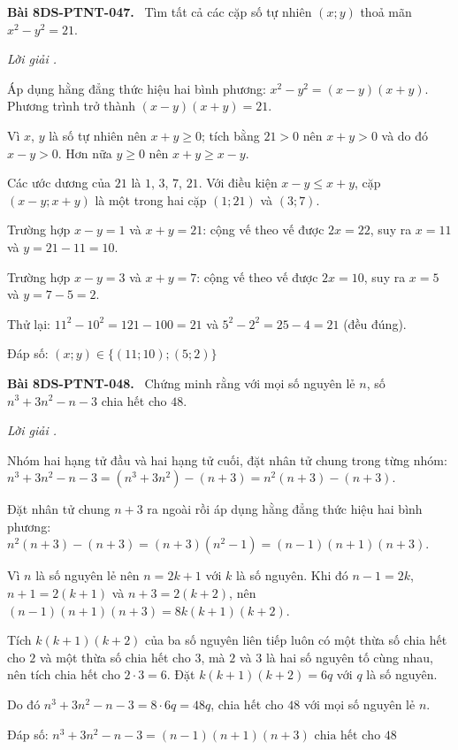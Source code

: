 \documentclass[12pt,a4paper]{article}
\newenvironment{problem}[1][]{\par\medskip\noindent\textbf{Bài #1.}\ }{\par}
\newenvironment{solution}[1][]{\par\noindent\textit{Lời giải #1.}\par}{\par}
\begin{document}
\begin{problem}[8DS-PTNT-047]
Tìm tất cả các cặp số tự nhiên $(x; y)$ thoả mãn $x^2 - y^2 = 21$.

\begin{solution}
Áp dụng hằng đẳng thức hiệu hai bình phương: $x^2 - y^2 = (x - y)(x + y)$. Phương trình trở thành $(x - y)(x + y) = 21$.

Vì $x$, $y$ là số tự nhiên nên $x + y \geq 0$; tích bằng $21 > 0$ nên $x + y > 0$ và do đó $x - y > 0$. Hơn nữa $y \geq 0$ nên $x + y \geq x - y$.

Các ước dương của $21$ là $1$, $3$, $7$, $21$. Với điều kiện $x - y \leq x + y$, cặp $(x - y; x + y)$ là một trong hai cặp $(1; 21)$ và $(3; 7)$.

Trường hợp $x - y = 1$ và $x + y = 21$: cộng vế theo vế được $2x = 22$, suy ra $x = 11$ và $y = 21 - 11 = 10$.

Trường hợp $x - y = 3$ và $x + y = 7$: cộng vế theo vế được $2x = 10$, suy ra $x = 5$ và $y = 7 - 5 = 2$.

Thử lại: $11^2 - 10^2 = 121 - 100 = 21$ và $5^2 - 2^2 = 25 - 4 = 21$ (đều đúng).

Đáp số: $\boxed{(x; y) \in \{(11; 10); (5; 2)\}}$
\end{solution}
\end{problem}

\begin{problem}[8DS-PTNT-048]
Chứng minh rằng với mọi số nguyên lẻ $n$, số $n^3 + 3n^2 - n - 3$ chia hết cho $48$.

\begin{solution}
Nhóm hai hạng tử đầu và hai hạng tử cuối, đặt nhân tử chung trong từng nhóm: $n^3 + 3n^2 - n - 3 = (n^3 + 3n^2) - (n + 3) = n^2(n + 3) - (n + 3)$.

Đặt nhân tử chung $n + 3$ ra ngoài rồi áp dụng hằng đẳng thức hiệu hai bình phương: $n^2(n + 3) - (n + 3) = (n + 3)(n^2 - 1) = (n - 1)(n + 1)(n + 3)$.

Vì $n$ là số nguyên lẻ nên $n = 2k + 1$ với $k$ là số nguyên. Khi đó $n - 1 = 2k$, $n + 1 = 2(k + 1)$ và $n + 3 = 2(k + 2)$, nên $(n - 1)(n + 1)(n + 3) = 8k(k + 1)(k + 2)$.

Tích $k(k + 1)(k + 2)$ của ba số nguyên liên tiếp luôn có một thừa số chia hết cho $2$ và một thừa số chia hết cho $3$, mà $2$ và $3$ là hai số nguyên tố cùng nhau, nên tích chia hết cho $2 \cdot 3 = 6$. Đặt $k(k + 1)(k + 2) = 6q$ với $q$ là số nguyên.

Do đó $n^3 + 3n^2 - n - 3 = 8 \cdot 6q = 48q$, chia hết cho $48$ với mọi số nguyên lẻ $n$.

Đáp số: $\boxed{n^3 + 3n^2 - n - 3 = (n - 1)(n + 1)(n + 3) \text{ chia hết cho } 48}$
\end{solution}
\end{problem}
\end{document}
